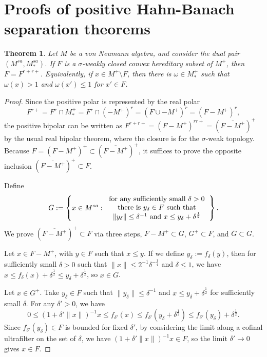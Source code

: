 \documentclass[noamsfonts,a4paper,10pt]{amsart}
\theoremstyle{plain}
\newtheorem{thm}{Theorem}[section]
\theoremstyle{definition}
\theoremstyle{remark}
\begin{document}
\section{Proofs of positive Hahn-Banach separation theorems}

\begin{thm}\label{1}
Let $M$ be a von Neumann algebra, and consider the dual pair $(M^{sa},M_*^{sa})$.
If $F$ is a $\sigma$-weakly closed convex hereditary subset of $M^+$, then $F=F^{r+r+}$.
Equivalently, if $x\in M^+\setminus F$, then there is $\omega\in M_*^+$ such that $\omega(x)>1$ and $\omega(x')\le1$ for $x'\in F$.
\end{thm}
\begin{proof}
Since the positive polar is represented by the real polar
\[F^{r+}=F^r\cap M_*^+=F^r\cap(-M^+)^r=(F\cup-M^+)^r=(F-M^+)^r,\]
the positive bipolar can be written as $F^{r+r+}=(F-M^+)^{rr+}=(\overline{F-M^+})^+$ by the usual real bipolar theorem, where the closure is for the $\sigma$-weak topology.
Because $F=(F-M^+)^+\subset(\overline{F-M^+})^+$, it suffices to prove the opposite inclusion $(\overline{F-M^+})^+\subset F$.

Define
\[G:=\left\{x\in M^{sa}:\begin{tabular}{c}
for any sufficiently small $\delta>0$\\
there is $y_\delta\in F$ such that\\
$\|y_\delta\|\le\delta^{-1}$ and $x\le y_\delta+\delta^{\frac12}$\\
\end{tabular}\right\}.\]
We prove $(\overline{F-M^+})^+\subset F$ via three steps, $F-M^+\subset G$, $G^+\subset F$, and $\overline G\subset G$.

Let $x\in F-M^+$, with $y\in F$ such that $x\le y$.
If we define $y_\delta:=f_\delta(y)$, then for sufficiently small $\delta>0$ such that $\|x\|\le2^{-1}\delta^{-\frac14}$ and $\delta\le1$, we have $x\le f_\delta(x)+\delta^{\frac12}\le y_\delta+\delta^{\frac12}$, so $x\in G$.

Let $x\in G^+$.
Take $y_\delta\in F$ such that $\|y_\delta\|\le\delta^{-1}$ and $x\le y_\delta+\delta^{\frac12}$ for sufficiently small $\delta$.
For any $\delta'>0$, we have
\[0\le(1+\delta'\|x\|)^{-1}x\le f_{\delta'}(x)\le f_{\delta'}(y_\delta+\delta^{\frac12})\le f_{\delta'}(y_\delta)+\delta^{\frac12}.\]
Since $f_{\delta'}(y_\delta)\in F$ is bounded for fixed $\delta'$, by considering the limit along a cofinal ultrafilter on the set of $\delta$, we have $(1+\delta'\|x\|)^{-1}x\in F$, so the limit $\delta'\to0$ gives $x\in F$.


\end{proof}
\end{document}
